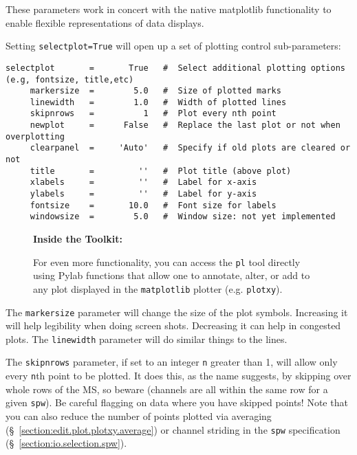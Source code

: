 These parameters work in concert with the native matplotlib
functionality to enable flexible representations of data displays. 

Setting {\tt selectplot=True} will open up a set of plotting control
sub-parameters:
\small
\begin{verbatim}
selectplot       =       True   #  Select additional plotting options (e.g, fontsize, title,etc)
     markersize  =        5.0   #  Size of plotted marks
     linewidth   =        1.0   #  Width of plotted lines
     skipnrows   =          1   #  Plot every nth point
     newplot     =      False   #  Replace the last plot or not when overplotting
     clearpanel  =     'Auto'   #  Specify if old plots are cleared or not
     title       =         ''   #  Plot title (above plot)
     xlabels     =         ''   #  Label for x-axis
     ylabels     =         ''   #  Label for y-axis
     fontsize    =       10.0   #  Font size for labels
     windowsize  =        5.0   #  Window size: not yet implemented
\end{verbatim}
\normalsize

\begin{wrapfigure}{r}{2.5in}
  \begin{boxedminipage}{2.5in}
     \centerline{\bf Inside the Toolkit:}
        For even more functionality, you can access the 
        {\tt pl} tool directly using Pylab functions that 
        allow one to annotate, alter, or add
        to any plot displayed in the {\tt matplotlib} plotter 
        (e.g. {\tt plotxy}).
  \end{boxedminipage}
\end{wrapfigure}

The {\tt markersize} parameter will change the size of the plot
symbols.  Increasing it will help legibility when doing screen shots.
Decreasing it can help in congested plots.  The {\tt linewidth}
parameter will do similar things to the lines.

The {\tt skipnrows} parameter, if set to an integer {\tt n} greater than 1,
will allow only every {\tt n}th point to be plotted.  It does this,
as the name suggests, by skipping over whole rows of the MS, so beware
(channels are all within the same row for a given {\tt spw}).  Be
careful flagging on data where you have skipped points!  Note
that you can also reduce the number of points plotted via averaging
(\S~\ref{section:edit.plot.plotxy.average}) or channel striding in the 
{\tt spw} specification (\S~\ref{section:io.selection.spw}).

